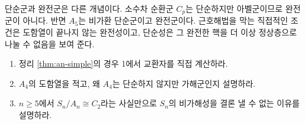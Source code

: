 \begin{pitfall}
단순군과 완전군은 다른 개념이다. 소수차 순환군 $C_p$는 단순하지만 아벨군이므로 완전군이 아니다. 반면 $A_5$는 비가환 단순군이고 완전군이다. 근호해법을 막는 직접적인 조건은 도함열이 끝나지 않는 완전성이고, 단순성은 그 완전한 핵을 더 이상 정상층으로 나눌 수 없음을 보여 준다.
\end{pitfall}

\begin{checkpoint}
\begin{enumerate}[label=(\alph*)]
  \item 정리 \ref{thm:an-simple}의 경우 1에서 교환자를 직접 계산하라.
  \item $A_4$의 도함열을 적고, 왜 $A_4$는 단순하지 않지만 가해군인지 설명하라.
  \item $n\ge5$에서 $S_n/A_n\cong C_2$라는 사실만으로 $S_n$의 비가해성을 결론 낼 수 없는 이유를 설명하라.
\end{enumerate}
\end{checkpoint}
